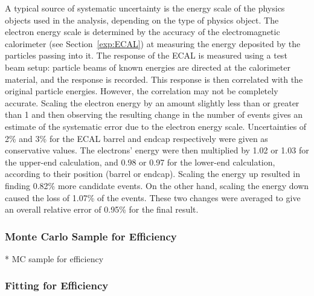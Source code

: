 A typical source of systematic uncertainty 
is the energy scale of the physics objects 
used in the analysis, 
depending on the type of physics object.  
The electron energy scale is determined 
by the accuracy of the electromagnetic 
calorimeter (see Section~\ref{exp:ECAL})
at measuring the energy 
deposited by the particles passing into it.  
The response of the ECAL is measured 
using a test beam setup: 
particle beams of known energies are 
directed at the calorimeter material, 
and the response is recorded.  
This response is then correlated with the 
original particle energies.  
However, the correlation may not be completely 
accurate.  
Scaling the electron energy by an amount 
slightly less than or greater than 1 
and then observing the resulting change 
in the number of \Zee events 
gives an estimate of the systematic error 
due to the electron energy scale.  
Uncertainties of 2\% and 3\% %
for the ECAL barrel and endcap respectively 
were given as conservative values.  
The electrons' energy were then multiplied 
by 1.02 or 1.03 for the upper-end calculation, 
and 0.98 or 0.97 for the lower-end calculation, 
according to their position (barrel or endcap).  
Scaling the energy up resulted in finding 
0.82\% more \Zee candidate events.  
On the other hand, scaling the energy down 
caused the loss of 1.07\% of the events.  
These two changes were averaged 
to give an overall relative error 
of 0.95\% for the final result.  

\subsubsection{Monte Carlo Sample for Efficiency}
\label{anMeth:SystsOtherMCEff}

   * MC sample for efficiency

\subsubsection{Fitting for Efficiency}
\label{anMeth:SystsOtherFitEff}

